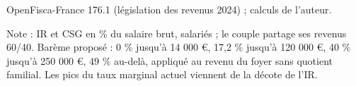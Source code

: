 OpenFisca-France 176.1 (législation des revenus 2024) ; calculs de l'auteur.\par Note : IR et CSG en \% du salaire brut, salariés ; le couple partage ses revenus 60/40. Barème proposé : 0 \% jusqu'à 14 000 \euro{}, 17,2 \% jusqu'à 120 000 \euro{}, 40 \% jusqu'à 250 000 \euro{}, 49 \% au-delà, appliqué au revenu du foyer sans quotient familial. Les pics du taux marginal actuel viennent de la décote de l'IR.

